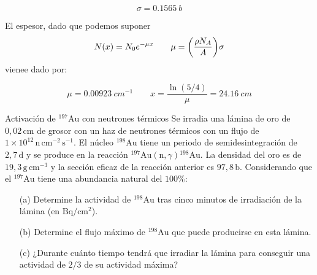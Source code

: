 \begin{equation}
   \sigma =  0.1565 \ \unit{b}
\end{equation}

El espesor, dado que podemos suponer 
\begin{equation}
    N(x) = N_0 e^{-\mu x} \qquad \mu = \pqty{\frac{\rho N_A}{A}} \sigma 
\end{equation}
vienee dado por:

\begin{equation}
    \mu =0.00923 \ \unit{cm^{-1}} \qquad  x = \frac{\ln(5/4)}{\mu} = 24.16 \ \unit{cm}
\end{equation}


\begin{Ejercicio}{Activación de ${}^{197}\mathrm{Au}$ con neutrones térmicos}\label{Ej:07}
Se irradia una lámina de oro de $0{,}02\,\mathrm{cm}$ de grosor con un haz de neutrones térmicos con un flujo de $1\times10^{12}\,\mathrm{n\,cm^{-2}\,s^{-1}}$.  
El núcleo ${}^{198}\mathrm{Au}$ tiene un periodo de semidesintegración de $2{,}7\,\mathrm{d}$ y se produce en la reacción ${}^{197}\mathrm{Au}(\mathrm{n},\gamma){}^{198}\mathrm{Au}$.  
La densidad del oro es de $19{,}3\,\mathrm{g\,cm^{-3}}$ y la sección eficaz de la reacción anterior es $97{,}8\,\mathrm{b}$.  
Considerando que el ${}^{197}\mathrm{Au}$ tiene una abundancia natural del $100\%$:

\begin{enumerate}
\item[(a)] Determine la actividad de ${}^{198}\mathrm{Au}$ tras cinco minutos de irradiación de la lámina (en $\mathrm{Bq/cm^2}$).
\item[(b)] Determine el flujo máximo de ${}^{198}\mathrm{Au}$ que puede producirse en esta lámina.
\item[(c)] ¿Durante cuánto tiempo tendrá que irradiar la lámina para conseguir una actividad de $2/3$ de su actividad máxima?
\end{enumerate}
\end{Ejercicio}

